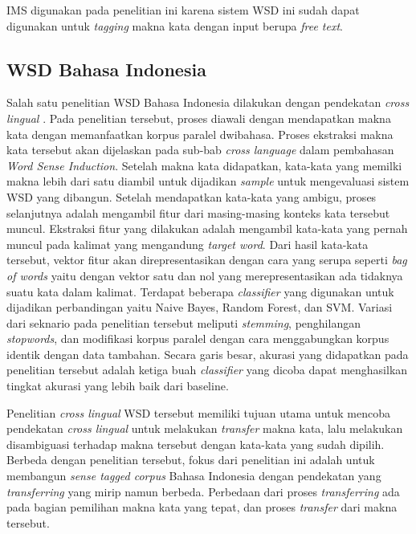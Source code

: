 IMS digunakan pada penelitian ini karena sistem WSD ini sudah dapat digunakan untuk \textit{tagging} makna kata dengan input berupa \textit{free text}.

\subsection{WSD Bahasa Indonesia}

Salah satu penelitian WSD Bahasa Indonesia dilakukan dengan pendekatan \textit{cross lingual} \citep{septiantri2013wsd}. Pada penelitian tersebut, proses diawali dengan mendapatkan makna kata dengan memanfaatkan korpus paralel dwibahasa. Proses ekstraksi makna kata tersebut akan dijelaskan pada sub-bab \textit{cross language} dalam pembahasan \textit{Word Sense Induction}. Setelah makna kata didapatkan, kata-kata yang memilki makna lebih dari satu diambil untuk dijadikan \textit{sample} untuk mengevaluasi sistem WSD yang dibangun. Setelah mendapatkan kata-kata yang ambigu, proses selanjutnya adalah mengambil fitur dari masing-masing konteks kata tersebut muncul. Ekstraksi fitur yang dilakukan adalah mengambil kata-kata yang pernah muncul pada kalimat yang mengandung \textit{target word}. Dari hasil kata-kata tersebut, vektor fitur akan direpresentasikan dengan cara yang serupa seperti \textit{bag of words} yaitu dengan vektor satu dan nol yang merepresentasikan ada tidaknya suatu kata dalam kalimat. Terdapat beberapa \textit{classifier} yang digunakan untuk dijadikan perbandingan yaitu Naive Bayes, Random Forest, dan SVM. Variasi dari seknario pada penelitian tersebut meliputi \textit{stemming}, penghilangan \textit{stopwords}, dan modifikasi korpus paralel dengan cara menggabungkan korpus identik dengan data tambahan. Secara garis besar, akurasi yang didapatkan pada penelitian tersebut adalah ketiga buah \textit{classifier} yang dicoba dapat menghasilkan tingkat akurasi yang lebih baik dari baseline.

Penelitian \textit{cross lingual} WSD \citep{septiantri2013wsd} tersebut memiliki tujuan utama untuk mencoba pendekatan \textit{cross lingual} untuk melakukan \textit{transfer} makna kata, lalu melakukan disambiguasi terhadap makna tersebut dengan kata-kata yang sudah dipilih. Berbeda dengan penelitian tersebut, fokus dari penelitian ini adalah untuk membangun \textit{sense tagged corpus} Bahasa Indonesia dengan pendekatan yang \textit{transferring} yang mirip namun berbeda. Perbedaan dari proses \textit{transferring} ada pada bagian pemilihan makna kata yang tepat, dan proses \textit{transfer} dari makna tersebut.
